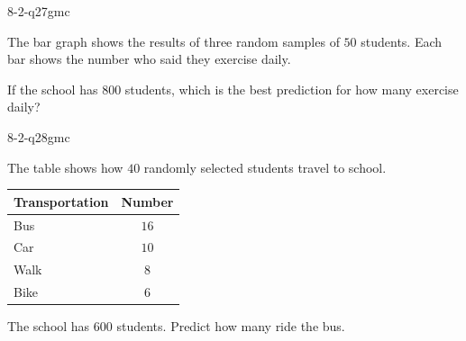 \begin{practiceQuestion}{8-2-q27}{gmc}
\begin{questionText}
The bar graph shows the results of three random samples of $50$ students. Each bar shows the number who said they exercise daily.

\begin{center}
\end{center}

If the school has $800$ students, which is the best prediction for how many exercise daily?
\end{questionText}
\end{practiceQuestion}

\begin{practiceQuestion}{8-2-q28}{gmc}
\begin{questionText}
The table shows how $40$ randomly selected students travel to school.

\begin{center}
\begin{tabular}{|l|c|}
\hline
\textbf{Transportation} & \textbf{Number} \\
\hline
Bus & $16$ \\
\hline
Car & $10$ \\
\hline
Walk & $8$ \\
\hline
Bike & $6$ \\
\hline
\end{tabular}
\end{center}

The school has $600$ students. Predict how many ride the bus.
\end{questionText}
\end{practiceQuestion}

